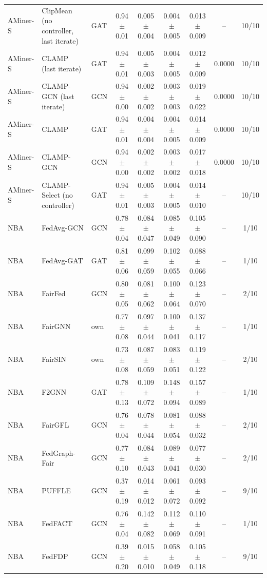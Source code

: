 \begin{longtable}{lp{2.2cm}lcccccc}
AMiner-S & ClipMean (no controller, last iterate) & GAT & 0.94$\pm$0.01 & 0.005$\pm$0.004 & 0.004$\pm$0.005 & 0.013$\pm$0.009 & -- & 10/10 \\
AMiner-S & CLAMP (last iterate) & GAT & 0.94$\pm$0.01 & 0.005$\pm$0.003 & 0.004$\pm$0.005 & 0.012$\pm$0.009 & 0.0000 & 10/10 \\
AMiner-S & CLAMP-GCN (last iterate) & GCN & 0.94$\pm$0.00 & 0.002$\pm$0.002 & 0.003$\pm$0.003 & 0.019$\pm$0.022 & 0.0000 & 10/10 \\
AMiner-S & CLAMP & GAT & 0.94$\pm$0.01 & 0.004$\pm$0.004 & 0.004$\pm$0.005 & 0.014$\pm$0.009 & 0.0000 & 10/10 \\
AMiner-S & CLAMP-GCN & GCN & 0.94$\pm$0.00 & 0.002$\pm$0.002 & 0.003$\pm$0.002 & 0.017$\pm$0.018 & 0.0000 & 10/10 \\
AMiner-S & CLAMP-Select (no controller) & GAT & 0.94$\pm$0.01 & 0.005$\pm$0.003 & 0.004$\pm$0.005 & 0.014$\pm$0.010 & -- & 10/10 \\
NBA & FedAvg-GCN & GCN & 0.78$\pm$0.04 & 0.084$\pm$0.047 & 0.085$\pm$0.049 & 0.105$\pm$0.090 & -- & 1/10 \\
NBA & FedAvg-GAT & GAT & 0.81$\pm$0.06 & 0.099$\pm$0.059 & 0.102$\pm$0.055 & 0.088$\pm$0.066 & -- & 1/10 \\
NBA & FairFed & GCN & 0.80$\pm$0.05 & 0.081$\pm$0.062 & 0.100$\pm$0.064 & 0.123$\pm$0.070 & -- & 2/10 \\
NBA & FairGNN & own & 0.77$\pm$0.08 & 0.097$\pm$0.044 & 0.100$\pm$0.041 & 0.137$\pm$0.117 & -- & 1/10 \\
NBA & FairSIN & own & 0.73$\pm$0.08 & 0.087$\pm$0.059 & 0.083$\pm$0.051 & 0.119$\pm$0.122 & -- & 2/10 \\
NBA & F2GNN & GAT & 0.78$\pm$0.13 & 0.109$\pm$0.072 & 0.148$\pm$0.094 & 0.157$\pm$0.089 & -- & 1/10 \\
NBA & FairGFL & GCN & 0.76$\pm$0.04 & 0.078$\pm$0.044 & 0.081$\pm$0.054 & 0.088$\pm$0.032 & -- & 2/10 \\
NBA & FedGraph-Fair & GCN & 0.77$\pm$0.10 & 0.084$\pm$0.043 & 0.089$\pm$0.041 & 0.077$\pm$0.030 & -- & 2/10 \\
NBA & PUFFLE & GCN & 0.37$\pm$0.19 & 0.014$\pm$0.012 & 0.061$\pm$0.072 & 0.093$\pm$0.092 & -- & 9/10 \\
NBA & FedFACT & GCN & 0.76$\pm$0.04 & 0.142$\pm$0.082 & 0.112$\pm$0.069 & 0.110$\pm$0.091 & -- & 1/10 \\
NBA & FedFDP & GCN & 0.39$\pm$0.20 & 0.015$\pm$0.010 & 0.058$\pm$0.049 & 0.105$\pm$0.118 & -- & 9/10 \\

\end{longtable}
